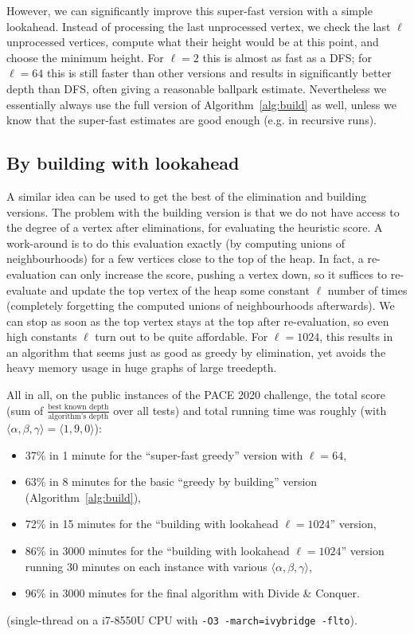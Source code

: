 \documentclass{timgad}
\begin{document}
However, we can significantly improve this super-fast version with a simple lookahead.
Instead of processing the last unprocessed vertex, we check the last $\ell$ unprocessed vertices, compute what their height would be at this point, and choose the minimum height.
For $\ell=2$ this is almost as fast as a DFS;
for $\ell=64$ this is still faster than other versions and results in significantly better depth than DFS, often giving a reasonable ballpark estimate.
Nevertheless we essentially always use the full version of Algorithm~\ref{alg:build} as well, unless we know that the super-fast estimates are good enough (e.g. in recursive runs).

\subsection{By building with lookahead}
A similar idea can be used to get the best of the elimination and building versions.
The problem with the building version is that we do not have access to the degree of a vertex after eliminations, for evaluating the heuristic score.
A work-around is to do this evaluation exactly (by computing unions of neighbourhoods) for a few vertices close to the top of the heap.
In fact, a re-evaluation can only increase the score, pushing a vertex down,
so it suffices to re-evaluate and update the top vertex of the heap some constant $\ell$ number of times (completely forgetting the computed unions of neighbourhoods afterwards).
We can stop as soon as the top vertex stays at the top after re-evaluation, so even high constants $\ell$ turn out to be quite affordable.
For $\ell=1024$, this results in an algorithm that seems just as good as greedy by elimination, yet avoids the heavy memory usage in huge graphs of large treedepth.

All in all, on the public instances of the PACE 2020 challenge, the total score (sum of $\frac{\text{best known depth}}{\text{algorithm's depth}}$ over all tests) and total running time was roughly (with $\langle\alpha,\beta,\gamma\rangle=\langle 1,9,0\rangle$):
\begin{itemize}[itemsep=0pt,parsep=-1ex]
\item 37\% in 1 minute for the ``super-fast greedy'' version with $\ell=64$,\\
\item 63\% in 8 minutes for the basic ``greedy by building'' version (Algorithm~\ref{alg:build}),\\
\item 72\% in 15 minutes for the ``building with lookahead $\ell=1024$'' version,\\
\item 86\% in 3000 minutes for the ``building with lookahead $\ell=1024$'' version running 30 minutes on each instance with various $\langle\alpha,\beta,\gamma\rangle$,\\
\item 96\% in 3000 minutes for the final algorithm with Divide \& Conquer.
\end{itemize}
(single-thread on a i7-8550U CPU with \texttt{-O3 -march=ivybridge -flto}).
\end{document}
